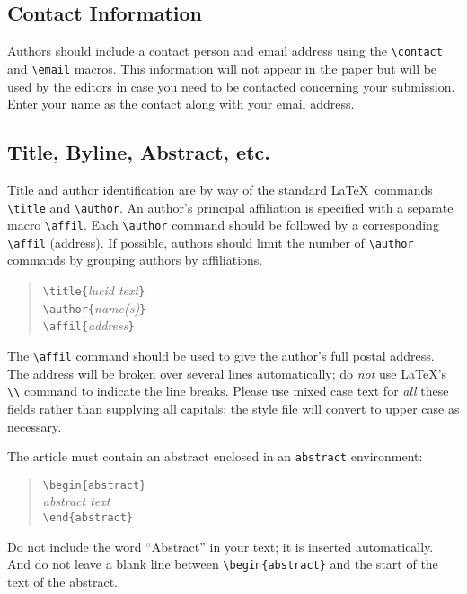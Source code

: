 \documentclass[11pt,twoside]{article}
\def\emphasize#1{{\sl#1\/}}
\def\arg#1{{\it#1\/}}
\begin{document}
\subsection{Contact Information}

Authors should include a contact person and email address using the 
\verb+\contact+ and \verb+\email+ macros.  This information will not
appear in the paper but will be used by the editors in case you need to be
contacted concerning your submission.  Enter your name as the contact along
with your email address.

\subsection{Title, Byline, Abstract, etc.}

Title and author identification are by way of the standard \LaTeX\
commands \verb+\title+ and \verb+\author+.  An author's principal
affiliation is specified with a separate macro \verb+\affil+.  Each
\verb+\author+ command should be followed by a corresponding \verb+\affil+
(address).  If possible, authors should limit the number of \verb+\author+
commands by grouping authors by affiliations.
\begin{quote}
\verb+\title{+\arg{lucid text}\verb+}+\\
\verb+\author{+\arg{name(s)}\verb+}+\\
\verb+\affil{+\arg{address}\verb+}+
\end{quote}
The \verb+\affil+ command should be used to give the author's full postal
address.  The address will be broken over several lines automatically;
do \emphasize{not} use \LaTeX's \verb+\\+ command to indicate the line
breaks.  Please use mixed case text for \emphasize{all} these fields
rather than supplying all capitals; the style file will convert to upper
case as necessary.

The article must contain an abstract enclosed in an \verb+abstract+
environment:
\begin{quote}
\verb+\begin{abstract}+\\
\arg{abstract text}\\
\verb+\end{abstract}+
\end{quote}
Do not include the word ``Abstract'' in your text; it is inserted
automatically.  And do not leave a blank line between \verb+\begin{abstract}+
and the start of the text of the abstract.
\end{document}
